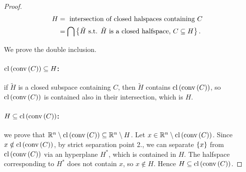 \begin{proof}
    
    \begin{align*}
        H &= \text{ intersection of closed halspaces containing } C \\
            &= \bigcap \left\{ \tilde{H} \text { s.t. } \tilde{H} \text{ is a closed halfspace, } C \subseteq H \right\}.
    \end{align*}

    We prove the double inclusion. 

    \paragraph{$\mathrm{cl}\left(\mathrm{conv}\left(C\right)\right) \subseteq H$:} if $\tilde{H}$ is a closed subspace containing $C$, then $\tilde{H}$ contains $\mathrm{cl}\left(\mathrm{conv}\left(C\right)\right)$, so $\mathrm{cl}\left(\mathrm{conv}\left(C\right)\right)$ is contained also in their intersection, which is $H$.

    \paragraph{$H \subseteq \mathrm{cl}\left(\mathrm{conv}\left(C\right)\right)$:} we prove that ${\mathbb{R}^n} \setminus \mathrm{cl}\left(\mathrm{conv}\left(C\right)\right) \subseteq {\mathbb{R}^n} \setminus H$. Let $x \in {\mathbb{R}^n} \setminus \mathrm{cl}\left(\mathrm{conv}\left(C\right)\right)$. Since $x \notin \mathrm{cl}\left(\mathrm{conv}\left(C\right)\right)$, by strict separation point 2., we can separate $\left\{ x \right\}$ from $\mathrm{cl}\left(\mathrm{conv}\left(C\right)\right)$ via an hyperplane $H^*$, which is contained in $H$. The halfspace corresponding to $H^*$ does not contain $x$, so $x \notin H$. Hence $H \subseteq \mathrm{cl}\left(\mathrm{conv}\left(C\right)\right)$.

\end{proof}
